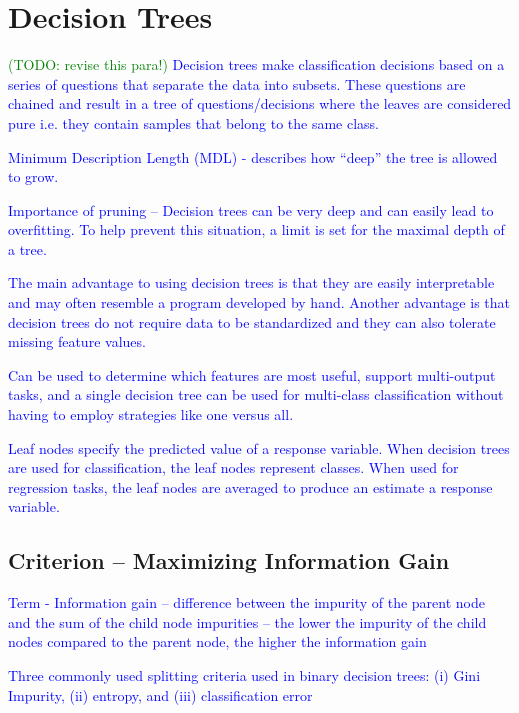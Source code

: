 \section{Decision Trees}

\textcolor{blue}{\textcolor{green}{(TODO: revise this para!)} Decision trees make classification decisions based on a series of questions that separate the data into subsets. These questions are chained and result in a tree of questions/decisions where the leaves are considered pure i.e. they contain samples that belong to the same class.}

\textcolor{blue}{Minimum Description Length (MDL) - describes how ``deep'' the tree is allowed to grow.}

\textcolor{blue}{Importance of pruning -- Decision trees can be very deep and can easily lead to overfitting. To help prevent this situation, a limit is set for the maximal depth of a tree. }

\textcolor{blue}{The main advantage to using decision trees is that they are easily interpretable and may often resemble a program developed by hand. Another advantage is that decision trees do not require data to be standardized and they can also tolerate missing feature values.}

\textcolor{blue}{Can be used to determine which features are most useful, support multi-output tasks, and a single decision tree can be used for multi-class classification without having to employ strategies like one versus all.}

\textcolor{blue}{Leaf nodes specify the predicted value of a response variable. When decision trees are used for classification, the leaf nodes represent classes. When used for regression tasks, the leaf nodes are averaged to produce an estimate a response variable.}

\subsection{Criterion -- Maximizing Information Gain}

\textcolor{blue}{Term - Information gain -- difference between the impurity of the parent node and the sum of the child node impurities -- the lower the impurity of the child nodes compared to the parent node, the higher the information gain}

\textcolor{blue}{Three commonly used splitting criteria used in binary decision trees: (i) Gini Impurity, (ii) entropy, and (iii) classification error}

